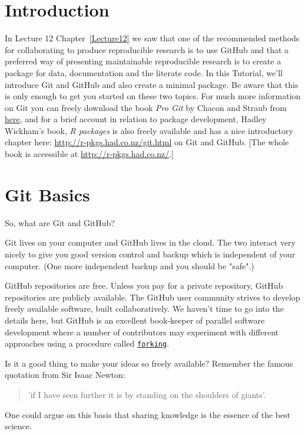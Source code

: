 \documentclass[titlepage]{book}\usepackage{knitr}
\begin{document}
\section{Introduction}

In Lecture 12 Chapter~\ref{Lecture12} we saw that one of the recommended methods for collaborating to produce reproducible research is to use GitHub and that a preferred way of presenting maintainable reproducible research is to create a package for data, documentation and the literate code.  In this Tutorial, we'll introduce Git and GitHub and also create a minimal package.  Be aware that this is only enough to get you started on these two topics.  For much more information on Git you can freely download the book \emph{Pro Git}\cite{Chacon2014} by Chacon and Straub from \href{http://git-scm.com/book/en/v2}{here}, and for a brief account in relation to package development, Hadley Wickham's book, \emph{R packages}\cite{Wickham2015b} is also freely available and has a nice introductory chapter here: \href{http://r-pkgs.had.co.nz/git.html}{http://r-pkgs.had.co.nz/git.html} on Git and GitHub.  [The whole book is accessible at \href{http://r-pkgs.had.co.nz/}{http://r-pkgs.had.co.nz/}.]

\section{Git Basics}

So, what are Git and GitHub?

Git lives on your computer and GitHub lives in the cloud. The two interact very nicely to give you good version control and backup which is independent of your computer. (One more independent backup and you should be "safe".) 

GitHub repositories are free.  Unless you pay for a private repository, GitHub repositories are publicly available. The GitHub user community strives to develop freely available software, built collaboratively. We haven't time to go into the details here, but GitHub is an excellent book-keeper of parallel software development where a number of contributors may experiment with  different approaches using a procedure called \href{https://en.wikipedia.org/wiki/Fork_(software_development)}{\texttt{forking}}. 

Is it a good thing to make your ideas so freely available? Remember the famous quotation from Sir Isaac Newton:
\begin{quote}
 'if I have seen further it is by standing on the shoulders of giants'.
 \end{quote}
One could argue on this basis that sharing knowledge is the essence of the best science. 
\end{document}
